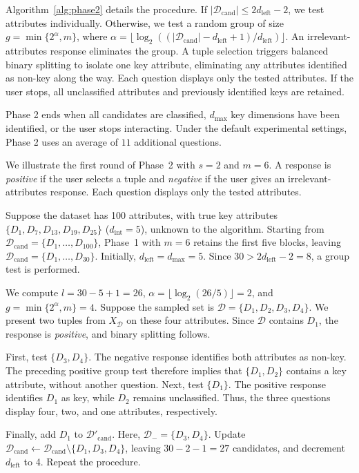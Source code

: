Algorithm~\ref{alg:phase2} details the procedure. If $\lvert\mathcal{D}_\text{cand}\rvert\leq2d_\text{left}-2$, we test attributes individually. Otherwise, we test a random group of size $g=\min\{2^\alpha,m\}$, where $\alpha=\lfloor\log_2((\lvert\mathcal{D}_\text{cand}\rvert-d_\text{left}+1)/d_\text{left})\rfloor$. An irrelevant-attributes response eliminates the group. A tuple selection triggers balanced binary splitting to isolate one key attribute, eliminating any attributes identified as non-key along the way. Each question displays only the tested attributes. If the user stops, all unclassified attributes and previously identified keys are retained.

Phase 2 ends when all candidates are classified, $d_\text{max}$ key dimensions have been identified, or the user stops interacting. Under the default experimental settings, Phase 2 uses an average of $11$ additional questions.

\begin{example}
{
We illustrate the first round of Phase~2 with $s=2$ and $m=6$. A response is \textit{positive} if the user selects a tuple and \textit{negative} if the user gives an irrelevant-attributes response. Each question displays only the tested attributes.\par}

Suppose the dataset has 100 attributes, with true key attributes $\{D_1,D_7,D_{13},D_{19},D_{25}\}$ ($d_\text{int}=5$), unknown to the algorithm. Starting from $\mathcal{D}_\text{cand}=\{D_1,\ldots,D_{100}\}$, Phase~1 with $m=6$ retains the first five blocks, leaving $\mathcal{D}_\text{cand}=\{D_1,\ldots,D_{30}\}$. Initially, $d_\text{left}=d_\text{max}=5$. Since $30>2d_\text{left}-2=8$, a group test is performed.

We compute $l=30-5+1=26$, $\alpha=\lfloor\log_2(26/5)\rfloor=2$, and $g=\min\{2^\alpha,m\}=4$. Suppose the sampled set is $\mathcal{D}=\{D_1,D_2,D_3,D_4\}$. We present two tuples from $X_\mathcal{D}$ on these four attributes. Since $\mathcal{D}$ contains $D_1$, the response is \textit{positive}, and binary splitting follows.

First, test $\{D_3,D_4\}$. The negative response identifies both attributes as non-key. The preceding positive group test therefore implies that $\{D_1,D_2\}$ contains a key attribute, without another question. Next, test $\{D_1\}$. The positive response identifies $D_1$ as key, while $D_2$ remains unclassified. Thus, the three questions display four, two, and one attributes, respectively.

Finally, add $D_1$ to $\mathcal{D}'_\text{cand}$. Here, $\mathcal{D}_{-}=\{D_3,D_4\}$. Update $\mathcal{D}_\text{cand}\gets\mathcal{D}_\text{cand}\setminus\{D_1,D_3,D_4\}$, leaving $30-2-1=27$ candidates, and decrement $d_\text{left}$ to 4. Repeat the procedure.
\end{example}

